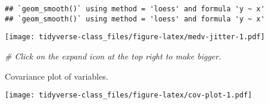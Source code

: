 \documentclass[]{book}
\newenvironment{Shaded}{\begin{snugshade}}{\end{snugshade}}
\newcommand{\KeywordTok}[1]{\textcolor[rgb]{0.13,0.29,0.53}{\textbf{#1}}}
\newcommand{\DataTypeTok}[1]{\textcolor[rgb]{0.13,0.29,0.53}{#1}}
\newcommand{\DecValTok}[1]{\textcolor[rgb]{0.00,0.00,0.81}{#1}}
\newcommand{\FloatTok}[1]{\textcolor[rgb]{0.00,0.00,0.81}{#1}}
\newcommand{\StringTok}[1]{\textcolor[rgb]{0.31,0.60,0.02}{#1}}
\newcommand{\CommentTok}[1]{\textcolor[rgb]{0.56,0.35,0.01}{\textit{#1}}}
\newcommand{\OperatorTok}[1]{\textcolor[rgb]{0.81,0.36,0.00}{\textbf{#1}}}
\newcommand{\NormalTok}[1]{#1}
\begin{document}
\begin{verbatim}
## `geom_smooth()` using method = 'loess' and formula 'y ~ x'
## `geom_smooth()` using method = 'loess' and formula 'y ~ x'
\end{verbatim}

\texttt{[image: tidyverse-class\_files/figure-latex/medv-jitter-1.pdf]}

\begin{Shaded}
\begin{Highlighting}[]
\CommentTok{# Click on the expand icon at the top right to make bigger.}
\end{Highlighting}
\end{Shaded}

Covariance plot of variables.

\begin{Shaded}
\end{Shaded}

\texttt{[image: tidyverse-class\_files/figure-latex/cov-plot-1.pdf]}
\end{document}
